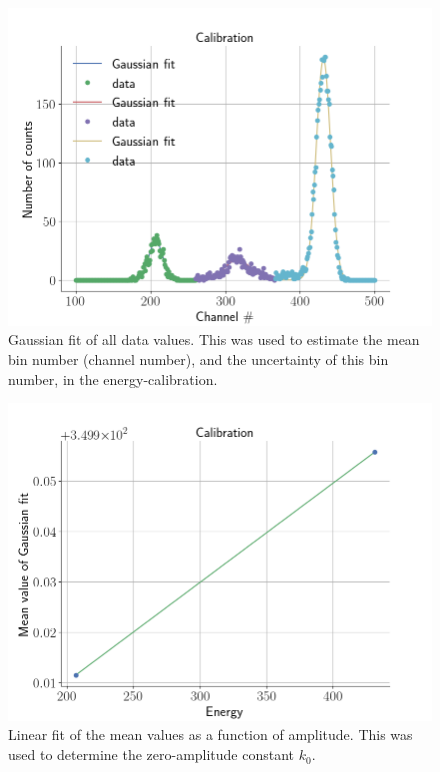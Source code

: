 \begin{figure}[t]
\centering
\includegraphics[width=0.99\columnwidth]{gaussian_fit2}
\caption{Gaussian fit of all data values. This was used to estimate the mean
bin number (channel number), and the uncertainty of this bin number, in the
energy-calibration.}
\label{fig_gaussian_fit2}
\end{figure}

\begin{figure}[t]
\centering
\includegraphics[width=0.99\columnwidth]{alpha_plotting}
\caption{Linear fit of the mean values as a function of amplitude. This was
used to determine the zero-amplitude constant $k_0$.}
\label{fig_linear_fit2}
\end{figure}




